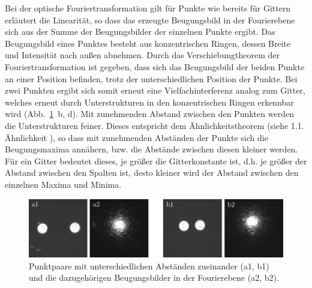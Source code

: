 Bei der optische Fouriertransformation gilt für Punkte wie bereits für Gittern erläutert die Linearität, so dass das erzeugte Beugungsbild in der Fourierebene sich aus der Summe der Beugungsbilder der einzelnen Punkte ergibt. Das Beugungsbild eines Punktes besteht aus konzentrischen Ringen, dessen Breite und Intensität nach außen abnehmen. Durch das Verschiebungtheorem der Fouriertransformation ist gegeben, dass sich das Beugungsbild der beiden Punkte an einer Position befinden, trotz der unterschiedlichen Position der Punkte. Bei zwei Punkten ergibt sich somit erneut eine Vielfachinterferenz analog zum Gitter, welches erneut durch Unterstrukturen in den konzentrischen Ringen erkennbar wird (Abb.~\ref{fig:punktpaare_verschieden_und_spektren}~b, d). Mit zunehmenden Abstand zwischen den Punkten werden die Unterstrukturen feiner. Dieses entspricht dem Ähnlichkeitstheorem (siehe 1.1. Ähnlichkeit%
), so dass mit zunehmenden Abständen der Punkte sich die Beugungsmaxima annähern, bzw. die Abstände zwischen diesen kleiner werden. Für ein Gitter bedeutet dieses, je größer die Gitterkonstante ist, d.h. je größer der Abstand zwischen den Spalten ist, desto kleiner wird der Abstand zwischen den einzelnen Maxima und Minima.

\begin{figure}[h]
	\centering
	\includegraphics{images/Regina/abb15.pdf}
	\caption[Punktpaare unterschiedlicher Abstände und Fourierspektren]{
		Punktpaare mit unterschiedlichen Abständen zueinander (a1, b1) und die dazugehörigen Beugungsbilder in der Fourierebene (a2, b2).
	}
	\label{fig:punktpaare_verschieden_und_spektren}
\end{figure}


